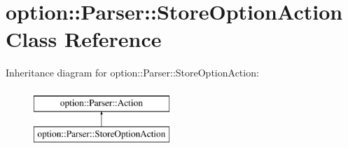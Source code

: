 \hypertarget{classoption_1_1_parser_1_1_store_option_action}{}\section{option\+:\+:Parser\+:\+:Store\+Option\+Action Class Reference}
\label{classoption_1_1_parser_1_1_store_option_action}
Inheritance diagram for option\+:\+:Parser\+:\+:Store\+Option\+Action\+:\begin{figure}[H]
\begin{center}
\leavevmode
\includegraphics[height=2.000000cm]{classoption_1_1_parser_1_1_store_option_action}
\end{center}
\end{figure}
